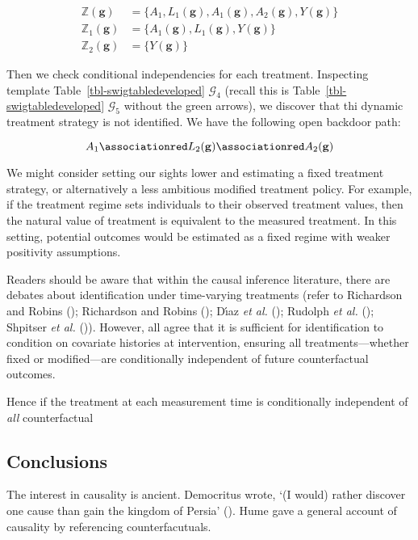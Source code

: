 \documentclass[
  single column]{article}
\begin{document}
\[
\begin{aligned}
\mathbb{Z}(\mathbf{g}) &= \{A_1, L_1(\mathbf{g}), A_1(\mathbf{g}), A_2(\mathbf{g}), Y(\mathbf{g})\} \\
\mathbb{Z}_1(\mathbf{g}) &= \{A_1(\mathbf{g}), L_1(\mathbf{g}), Y(\mathbf{g})\} \\
\mathbb{Z}_2(\mathbf{g}) &= \{Y(\mathbf{g})\}
\end{aligned}
\]

Then we check conditional independencies for each treatment. Inspecting
template Table~\ref{tbl-swigtabledeveloped} \(\mathcal{G}_4\) (recall
this is Table~\ref{tbl-swigtabledeveloped} \(\mathcal{G}_5\) without the
green arrows), we discover that thi dynamic treatment strategy is not
identified. We have the following open backdoor path:

\[
A_1 \associationred L_2(\mathbf{g}) \associationred A_2(\mathbf{g})
\]

We might consider setting our sights lower and estimating a fixed
treatment strategy, or alternatively a less ambitious modified treatment
policy. For example, if the treatment regime sets individuals to their
observed treatment values, then the natural value of treatment is
equivalent to the measured treatment. In this setting, potential
outcomes would be estimated as a fixed regime with weaker positivity
assumptions.

Readers should be aware that within the causal inference literature,
there are debates about identification under time-varying treatments
(refer to Richardson and Robins
(); Richardson and Robins
(); Dı́az \emph{et al.}
(); Rudolph \emph{et al.}
(); Shpitser \emph{et al.}
()). However, all agree
that it is sufficient for identification to condition on covariate
histories at intervention, ensuring all treatments---whether fixed or
modified---are conditionally independent of future counterfactual
outcomes.

Hence if the treatment at each measurement time is conditionally
independent of \emph{all} counterfactual

\subsection{Conclusions}\label{conclusions}

The interest in causality is ancient. Democritus wrote, `(I would)
rather discover one cause than gain the kingdom of Persia'
(). Hume gave a general
account of causality by referencing counterfacutuals.
\end{document}
